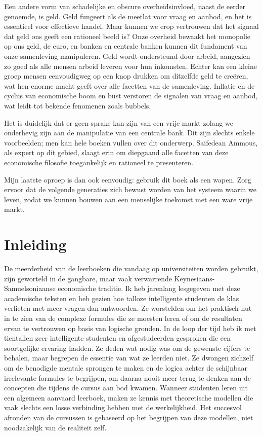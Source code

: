 \documentclass[
  a5paper,
  smalldemyvopaper,11pt,twoside,onecolumn,openright,extrafontsizes,
hidelinks]{memoir}
\begin{document}
Een andere vorm van schadelijke en obscure overheidsinvloed, naast de
eerder genoemde, is geld. Geld fungeert als de meetlat voor vraag en
aanbod, en het is essentieel voor effectieve handel. Maar kunnen we erop
vertrouwen dat het signaal dat geld ons geeft een rationeel beeld is?
Onze overheid bewaakt het monopolie op ons geld, de euro, en banken en
centrale banken kunnen dit fundament van onze samenleving manipuleren.
Geld wordt ondersteund door arbeid, aangezien zo goed als alle mensen
arbeid leveren voor hun inkomsten. Echter kan een kleine groep mensen
eenvoudigweg op een knop drukken om ditzelfde geld te creëren, wat hen
enorme macht geeft over alle facetten van de samenleving. Inflatie en de
cyclus van economische boom en bust verstoren de signalen van vraag en
aanbod, wat leidt tot bekende fenomenen zoals bubbels.

Het is duidelijk dat er geen sprake kan zijn van een vrije markt zolang
we onderhevig zijn aan de manipulatie van een centrale bank. Dit zijn
slechts enkele voorbeelden; men kan hele boeken vullen over dit
onderwerp. Saifedean Ammous, als expert op dit gebied, slaagt erin om
diepgaand alle facetten van deze economische filosofie toegankelijk en
rationeel te presenteren.

Mijn laatste oproep is dan ook eenvoudig: gebruik dit boek als een
wapen. Zorg ervoor dat de volgende generaties zich bewust worden van het
systeem waarin we leven, zodat we kunnen bouwen aan een menselijke
toekomst met een ware vrije markt.


\chapter*{Inleiding}\label{inleiding}


De meerderheid van de leerboeken die vandaag op universiteiten worden
gebruikt, zijn geworteld in de gangbare, maar vaak verwarrende
Keynesiaans-Samuelsoniaanse economische traditie. Ik heb jarenlang
lesgegeven met deze academische teksten en heb gezien hoe talloze
intelligente studenten de klas verlieten met meer vragen dan antwoorden.
Ze worstelden om het praktisch nut in te zien van de complexe formules
die ze moesten leren of om de resultaten ervan te vertrouwen op basis
van logische gronden. In de loop der tijd heb ik met tientallen zeer
intelligente studenten en afgestudeerden gesproken die een soortgelijke
ervaring hadden. Ze deden wat nodig was om de gewenste cijfers te
behalen, maar begrepen de essentie van wat ze leerden niet. Ze dwongen
zichzelf om de benodigde mentale sprongen te maken en de logica achter
de schijnbaar irrelevante formules te begrijpen, om daarna nooit meer
terug te denken aan de concepten die tijdens de cursus aan bod kwamen.
Wanneer studenten leren uit een algemeen aanvaard leerboek, maken ze
kennis met theoretische modellen die vaak slechts een losse verbinding
hebben met de werkelijkheid. Het succesvol afronden van de cursussen is
gebaseerd op het begrijpen van deze modellen, niet noodzakelijk van de
realiteit zelf.
\end{document}
